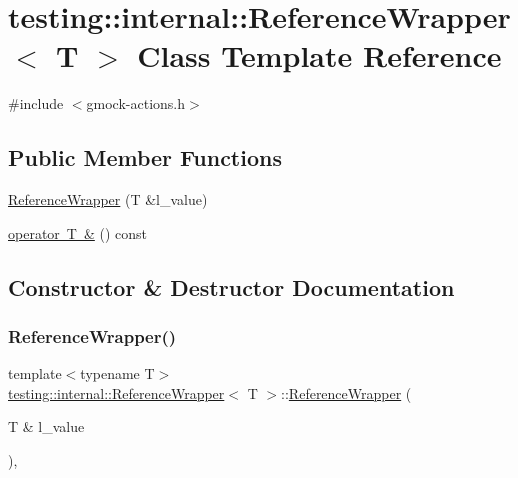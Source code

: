 \hypertarget{classtesting_1_1internal_1_1ReferenceWrapper}{}\section{testing\+::internal\+::Reference\+Wrapper$<$ T $>$ Class Template Reference}
\label{classtesting_1_1internal_1_1ReferenceWrapper}


{\ttfamily \#include $<$gmock-\/actions.\+h$>$}

\subsection*{Public Member Functions}
\begin{DoxyCompactItemize}
\item 
\mbox{\hyperlink{classtesting_1_1internal_1_1ReferenceWrapper_ad33597ffc478c3af9190d1a288a76d39}{Reference\+Wrapper}} (T \&l\+\_\+value)
\item 
\mbox{\hyperlink{classtesting_1_1internal_1_1ReferenceWrapper_a90ff0f93425244ca7f9cbd1d46017e80}{operator T \&}} () const
\end{DoxyCompactItemize}


\subsection{Constructor \& Destructor Documentation}
\mbox{\label{classtesting_1_1internal_1_1ReferenceWrapper_ad33597ffc478c3af9190d1a288a76d39}} 
\subsubsection{\texorpdfstring{ReferenceWrapper()}{ReferenceWrapper()}}
{\footnotesize\ttfamily template$<$typename T$>$ \\
\mbox{\hyperlink{classtesting_1_1internal_1_1ReferenceWrapper}{testing\+::internal\+::\+Reference\+Wrapper}}$<$ T $>$\+::\mbox{\hyperlink{classtesting_1_1internal_1_1ReferenceWrapper}{Reference\+Wrapper}} (\begin{DoxyParamCaption}\item[{T \&}]{l\+\_\+value }\end{DoxyParamCaption})\hspace{0.3cm}{\ttfamily [inline]}, {\ttfamily [explicit]}}



